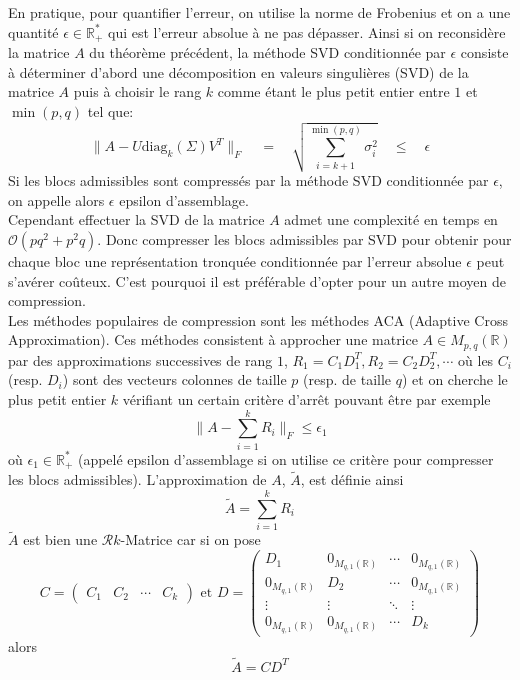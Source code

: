 En pratique, pour quantifier l'erreur, on utilise la norme de Frobenius et on a une quantité $\epsilon \in \mathbb{R}^{*}_{+}$ qui
est l'erreur absolue à ne pas dépasser. Ainsi si on reconsidère la matrice $A$ du théorème précédent, la méthode SVD conditionnée par $\epsilon$ consiste à déterminer
d'abord une décomposition en valeurs singulières (SVD)
de la matrice $A$ puis à choisir le rang $k$ comme étant le plus petit entier entre $1$ et $\min(p,q)$ tel que:
\begin{equation*} \|A - U\mathrm{diag}_{k}(\Sigma)V^{T}\|_{F} \quad = \quad \sqrt{\displaystyle\sum_{i=k+1}^{\min(p,q)} \sigma_{i}^2} \quad \leq \quad \epsilon \end{equation*}
Si les blocs admissibles sont compressés par la méthode SVD conditionnée par $\epsilon$, on appelle alors $\epsilon$ epsilon d'assemblage.\\
Cependant effectuer la SVD de la matrice $A$ admet une complexité en temps en $\mathcal{O}(pq^2 + p^2q)$. Donc compresser les blocs admissibles
par SVD pour obtenir pour chaque bloc une représentation tronquée conditionnée par l'erreur absolue $\epsilon$ peut s'avérer coûteux. C'est pourquoi il est préférable
d'opter pour un autre moyen de compression.\\

Les méthodes populaires de compression sont les méthodes ACA (Adaptive Cross Approximation). Ces méthodes
consistent à approcher une matrice $A \in M_{p,q}(\mathbb{R})$ par des approximations successives de rang $1$, $R_1 = C_1D_{1}^{T},  R_2 = C_2D_{2}^{T}, \cdots$
où les $C_i$ (resp. $D_i$) sont des vecteurs colonnes de taille $p$ (resp. de taille $q$)
et on cherche le plus petit entier $k$ vérifiant un certain critère d'arrêt pouvant être par exemple
\begin{equation} \|A - \displaystyle\sum_{i=1}^{k} R_i \|_{F} \leq \epsilon_1  \label{ACAcrit}\end{equation}
où $\epsilon_1 \in \mathbb{R}^{*}_{+}$ (appelé epsilon d'assemblage si on utilise ce critère pour compresser les blocs admissibles).
L'approximation de $A$, $\tilde{A}$, est définie ainsi \begin{equation*}\tilde{A} = \displaystyle\sum_{i=1}^{k} R_i \end{equation*}
$\tilde{A}$ est bien une $\mathcal{R}k$-Matrice car si on pose
\begin{equation*} C = \begin{pmatrix} C_1 & C_2 & \cdots & C_k \end{pmatrix} \text{ et } D = \begin{pmatrix}
    D_{1} & 0_{M_{q,1}(\mathbb{R})} & \cdots & 0_{M_{q,1}(\mathbb{R})} \\
    0_{M_{q,1}(\mathbb{R})} & D_{2} & \cdots & 0_{M_{q,1}(\mathbb{R})} \\
    \vdots & \vdots & \ddots & \vdots \\
    0_{M_{q,1}(\mathbb{R})} &  0_{M_{q,1}(\mathbb{R})} & \cdots & D_{k}
    \end{pmatrix}
   \end{equation*} alors \begin{equation*}\tilde{A} = CD^{T} \end{equation*}


